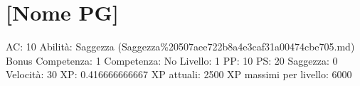 \section{{[}Nome PG{]}}\label{nome-pg}

AC: 10 Abilità: Saggezza
(Saggezza\%20507aee722b8a4e3caf31a00474cbe705.md) Bonus Competenza: 1
Competenza: No Livello: 1 PP: 10 PS: 20 Saggezza: 0 Velocità: 30 XP:
0.416666666667 XP attuali: 2500 XP massimi per livello: 6000
